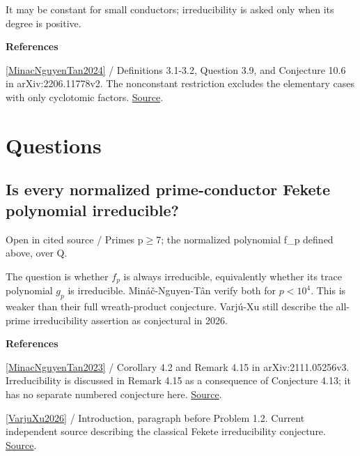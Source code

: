 \documentclass[11pt,a4paper,oneside,openany]{book}
\newcommand{\atlasdisplay}[1]{\par\begingroup\centering\vspace{3pt}\noindent\adjustbox{max width=\linewidth}{\(\displaystyle #1\)}\par\vspace{5pt}\endgroup}
\newenvironment{sources}{\par\smallskip\begingroup\footnotesize\color{atlasgray}\leftskip=10pt\setlength{\parskip}{2pt}}{\par\endgroup\smallskip}
\begin{document}
\atlasdisplay{R_\Delta=\pm\frac{F_\Delta}{x\prod_{d\ge1}\Phi_d^{r_\Delta(d)}}.}
\color{black} It may be constant for small conductors; irreducibility is asked only when its degree is positive.\par
\begin{sources}
\textbf{References}\par\smallskip
\noindent\hyperlink{ref:MinacNguyenTan2024}{[MinacNguyenTan2024]} / Definitions 3.1-3.2, Question 3.9, and Conjecture 10.6 in arXiv:2206.11778v2. The nonconstant restriction excludes the elementary cases with only cyclotomic factors. \href{https://arxiv.org/abs/2206.11778}{Source}.\par
\end{sources}\color{black}
\section*{Questions}
\subsection*{Is every normalized prime-conductor Fekete polynomial irreducible?}
{\small\sffamily\color{atlasgold}Open in cited source / Primes p\ensuremath{\ge}7; the normalized polynomial f\_\allowbreak{}p defined above, over Q.}\par\smallskip
\color{black} The question is whether \(f_p\) is always irreducible, equivalently whether its trace polynomial \(g_p\) is irreducible. Mináč-Nguyen-Tân verify both for \(p<10^4\). This is weaker than their full wreath-product conjecture. Varjú-Xu still describe the all-prime irreducibility assertion as conjectural in 2026.\par
\begin{sources}
\textbf{References}\par\smallskip
\noindent\hyperlink{ref:MinacNguyenTan2023}{[MinacNguyenTan2023]} / Corollary 4.2 and Remark 4.15 in arXiv:2111.05256v3. Irreducibility is discussed in Remark 4.15 as a consequence of Conjecture 4.13; it has no separate numbered conjecture here. \href{https://arxiv.org/abs/2111.05256}{Source}.\par
\noindent\hyperlink{ref:VarjuXu2026}{[VarjuXu2026]} / Introduction, paragraph before Problem 1.2. Current independent source describing the classical Fekete irreducibility conjecture. \href{https://arxiv.org/abs/2511.04240}{Source}.\par
\end{sources}\color{black}
\end{document}

